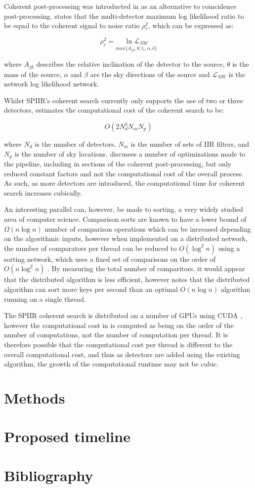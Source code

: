 \documentclass{article}
\begin{document}
Coherent post-processing was introducted in \cite{ChuThesis} as an alternative to coincidence
post-processing. \cite{ChuThesis} states that the multi-detector maximum log likelihood ratio to be
equal to the coherent signal to noise ratio \(\rho{}^2_c\), which can be expressed as:

\begin{equation}
    \rho^2_c = \underset{max\{A_{jk},\theta,t_{c},\alpha,\delta\}}{\ln \mathcal{L}_{NW}}
\end{equation}

where \(A_{jk}\) describes the relative inclination of the detector to the source, \(\theta\) is the
mass of the source, \(\alpha\) and \(\beta\) are the sky directions of the source and
\(\mathcal{L}_{NW}\) is the network log likelihood network.

Whilst SPIIR's coherent search currently only supports the use of two or three detectors,
\cite{ChuThesis} estimates the computational cost of the coherent search to be:

\begin{equation}
    O(2N^3_dN_mN_p)
\end{equation}

where \(N_d\) is the number of detectors, \(N_m\) is the number of sets of IIR filters, and \(N_p\)
is the number of sky locations. \cite{SPIIRGPU2018} discusses a number of optimizations made to the
pipeline, including in sections of the coherent post-processing, but only reduced constant factors
and not the computational cost of the overall process. As such, as more detectors are introduced,
the computational time for coherent search increases cubically.

An interesting parallel can, however, be made to sorting, a very widely studied area of computer
science. Comparison sorts are known to have a lower bound of \(\Omega{}(n\log{n})\) number of
comparison operations \cite{CLRS} which can be increased depending on the algorithmic inputs,
however when implemented on a distributed network, the number of comparators per thread can be
reduced to \(O(\log^2{n})\) using a sorting network, which uses a fixed set of comparisons on the
order of \(O(n\log^2{n})\) \cite{nvidia}. By measuring the total number of comparitors, it would
appear that the distributed algorithm is less efficient, however \cite{nvidia} notes that the
distributed algorithm can sort more keys per second than an optimal \(O(n\log{n})\) algorithm
running on a single thread.

The SPIIR coherent search is distributed on a number of GPUs using CUDA \cite{SPIIRGPU2018}, however
the computational cost in \cite{ChuThesis} is computed as being on the order of the number of
computations, not the number of computation per thread. It is therefore possible that the
computational cost per thread is different to the overall computational cost, and thus as detectors
are added using the existing algorithm, the growth of the computational runtime may not be cubic.

\section{Methods}
\section{Proposed timeline}
\section{Bibliography}
\printbibliography{}
\end{document}
